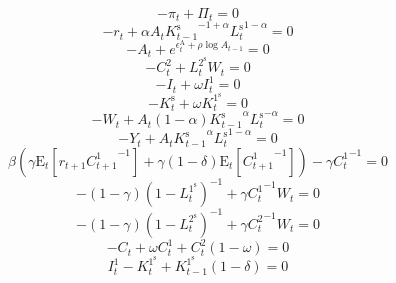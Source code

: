 \begin{equation}
-\pi_{t} + \Pi_{t} = 0
\end{equation}
\begin{equation}
-r_{t} + {\alpha} {A_{t}} {{K^{\mathrm{s}}_{t-1}}^{-1 + \alpha}} {{L^{\mathrm{s}}_{t}}^{1 - \alpha}} = 0
\end{equation}
\begin{equation}
-A_{t} + e^{\epsilon^{\mathrm{A}}_{t} + {\rho} {\log{A_{t-1}}}} = 0
\end{equation}
\begin{equation}
-C^{\mathrm{2}}_{t} + {L^{\mathrm{2}^{\mathrm{s}}}_{t}} {W_{t}} = 0
\end{equation}
\begin{equation}
-I_{t} + {\omega} {I^{\mathrm{1}}_{t}} = 0
\end{equation}
\begin{equation}
-K^{\mathrm{s}}_{t} + {\omega} {K^{\mathrm{1}^{\mathrm{s}}}_{t}} = 0
\end{equation}
\begin{equation}
-W_{t} + {A_{t}} \left(1 - \alpha\right) {{K^{\mathrm{s}}_{t-1}}^{\alpha}} {{L^{\mathrm{s}}_{t}}^{-\alpha}} = 0
\end{equation}
\begin{equation}
-Y_{t} + {A_{t}} {{K^{\mathrm{s}}_{t-1}}^{\alpha}} {{L^{\mathrm{s}}_{t}}^{1 - \alpha}} = 0
\end{equation}
\begin{equation}
{\beta} \left({\gamma} {\mathrm{E}_{t}\left[{r_{t+1}} {C^{\mathrm{1}}_{t+1}}^{-1}\right]} + {\gamma} \left(1 - \delta\right) {\mathrm{E}_{t}\left[{C^{\mathrm{1}}_{t+1}}^{-1}\right]}\right) - {\gamma} {C^{\mathrm{1}}_{t}}^{-1} = 0
\end{equation}
\begin{equation}
-\left(1 - \gamma\right) \left(1 - L^{\mathrm{1}^{\mathrm{s}}}_{t}\right)^{-1} + {\gamma} {C^{\mathrm{1}}_{t}}^{-1} {W_{t}} = 0
\end{equation}
\begin{equation}
-\left(1 - \gamma\right) \left(1 - L^{\mathrm{2}^{\mathrm{s}}}_{t}\right)^{-1} + {\gamma} {C^{\mathrm{2}}_{t}}^{-1} {W_{t}} = 0
\end{equation}
\begin{equation}
-C_{t} + {\omega} {C^{\mathrm{1}}_{t}} + {C^{\mathrm{2}}_{t}} \left(1 - \omega\right) = 0
\end{equation}
\begin{equation}
I^{\mathrm{1}}_{t} - K^{\mathrm{1}^{\mathrm{s}}}_{t} + {K^{\mathrm{1}^{\mathrm{s}}}_{t-1}} \left(1 - \delta\right) = 0
\end{equation}
